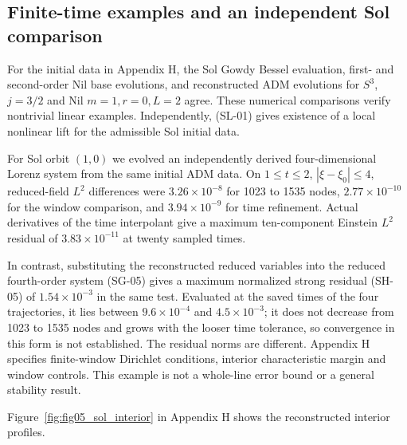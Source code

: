 \subsection{Finite-time examples and an independent Sol comparison}

For the initial data in Appendix H, the Sol Gowdy Bessel evaluation, first- and second-order Nil base evolutions, and reconstructed ADM evolutions for $S^3$, $j=3/2$ and Nil $m=1,r=0,L=2$ agree. These numerical comparisons verify nontrivial linear examples. Independently, (SL-01) gives existence of a local nonlinear lift for the admissible Sol initial data.

For Sol orbit $(1,0)$ we evolved an independently derived four-dimensional Lorenz system from the same initial ADM data. On $1\le t\le2$, $|\xi-\xi_0|\le4$, reduced-field $L^2$ differences were $3.26\times10^{-8}$ for 1023 to 1535 nodes, $2.77\times10^{-10}$ for the window comparison, and $3.94\times10^{-9}$ for time refinement. Actual derivatives of the time interpolant give a maximum ten-component Einstein $L^2$ residual of $3.83\times10^{-11}$ at twenty sampled times.

In contrast, substituting the reconstructed reduced variables into the reduced fourth-order system (SG-05) gives a maximum normalized strong residual (SH-05) of $1.54\times10^{-3}$ in the same test. Evaluated at the saved times of the four trajectories, it lies between $9.6\times10^{-4}$ and $4.5\times10^{-3}$; it does not decrease from 1023 to 1535 nodes and grows with the looser time tolerance, so convergence in this form is not established. The residual norms are different. Appendix H specifies finite-window Dirichlet conditions, interior characteristic margin and window controls. This example is not a whole-line error bound or a general stability result.

Figure~\ref{fig:fig05_sol_interior} in Appendix H shows the reconstructed interior profiles.

